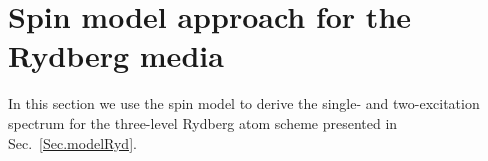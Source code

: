\documentclass[pra,twocolumn,showpacs,preprintnumbers,amsmath,amssymb]{revtex4-1}
\begin{document}



\section{Spin model approach for the Rydberg media}\label{App.A}
In this section we use the spin model to derive the single- and two-excitation spectrum for the three-level Rydberg atom scheme presented in Sec.~\ref{Sec.modelRyd}.
\end{document}

